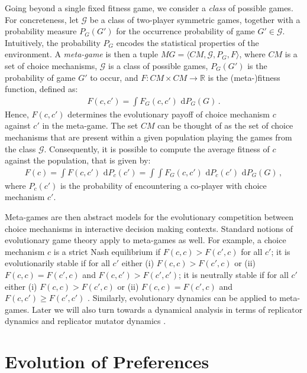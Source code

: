 \documentclass[fleqn,reqno,12pt]{article}
\theoremstyle{Satz}
\theoremstyle{Bsp}
\begin{document}
Going beyond a single fixed fitness game, we consider a \textit{class} of possible games. For
concreteness, let $\mathcal{G}$ be a class of two-player symmetric games, together with a
probability measure $P_G(G')$ for the occurrence probability of game
$G' \in \mathcal{G}$. Intuitively, the probability $P_G$ encodes the statistical
properties of the environment. A \textit{meta-game} is then a tuple
$ MG=\langle CM, \mathcal{G}, P_G,F \rangle$, where $CM$ is a set of choice
mechanisms, $\mathcal{G}$ is a class of possible games, $P_G(G')$ is the probability
of game $G'$ to occur, and $F:CM \times CM \rightarrow \mathbb{R}$ is the (meta-)fitness
function, defined as:
\begin{align}
  \label{eq:FittnessChoiceMechGamePairwise}
  F(c, c') = \int  F_G(c,c') \text{ d} P_G(G) \,.
\end{align}
Hence, $F(c,c')$ determines the evolutionary payoff of choice mechanism $c$ against $c'$ in the
meta-game. The set $CM$ can be thought of as the set of choice mechanisms that are present within a given
population playing the games from the class $\mathcal{G}$. Consequently, it is possible
to compute the average fitness of $c$ against the population, that is given by:
\begin{align}
  \label{eq:FittnessChoiceMechGame}
  F(c) = \int F(c,c') \text{ d} P_{c}(c') = \int \int   F_G(c,c') \text{ d} P_c(c') \text{ d} P_G(G)  \,,
\end{align}
where $P_c(c')$ is the probability of
encountering a co-player with choice mechanism $c'$.

Meta-games are then abstract models for the evolutionary competition between choice mechanisms
in interactive decision making contexts.  Standard notions of evolutionary game theory apply to
meta-games as well. For example, a choice mechanism $c$ is a strict Nash equilibrium if
$F(c,c) > F(c',c)$ for all $c'$; it is evolutionarily stable if for all $c'$ either (i)
$F(c,c) > F(c',c)$ or (ii) $F(c,c) = F(c',c)$ and $F(c,c') > F(c',c')$; it is neutrally stable
if for all $c'$ either (i) $F(c,c) > F(c',c)$ or (ii) $F(c,c) = F(c',c)$ and
$F(c,c') \ge F(c',c')$ \citep{Maynard-Smith1982:Evolution-and-t}. Similarly, evolutionary
dynamics can be applied to meta-games. Later we will also turn towards a dynamical analysis in terms of replicator dynamics
\citep{TaylorJonker1978:Evolutionary-St} and replicator mutator dynamics
\citep[e.g.,][]{Nowak2006:Evolutionary-Dy}.

\section{Evolution of Preferences} \label{sec:model}
\end{document}
